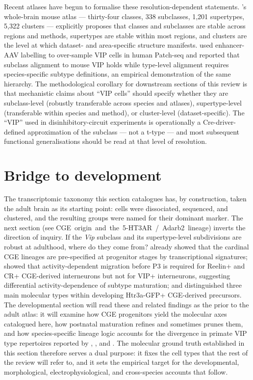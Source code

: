 \documentclass[11pt]{article}
\begin{document}
Recent atlases have begun to formalise these resolution-dependent statements. \citet{Yao2023}'s whole-brain mouse atlas --- thirty-four classes, 338 subclasses, 1,201 supertypes, 5,322 clusters --- explicitly proposes that classes and subclasses are stable across regions and methods, supertypes are stable within most regions, and clusters are the level at which dataset- and area-specific structure manifests. \citet{Lee2023a} used enhancer-AAV labelling to over-sample VIP cells in human Patch-seq and reported that subclass alignment to mouse VIP holds while type-level alignment requires species-specific subtype definitions, an empirical demonstration of the same hierarchy. The methodological corollary for downstream sections of this review is that mechanistic claims about ``VIP cells'' should specify whether they are subclass-level (robustly transferable across species and atlases), supertype-level (transferable within species and method), or cluster-level (dataset-specific). The ``VIP'' used in disinhibitory-circuit experiments is operationally a Cre-driver-defined approximation of the subclass --- not a t-type --- and most subsequent functional generalisations should be read at that level of resolution.

\section{Bridge to development}

The transcriptomic taxonomy this section catalogues has, by construction, taken the adult brain as its starting point: cells were dissociated, sequenced, and clustered, and the resulting groups were named for their dominant marker. The next section (see CGE~origin~and~the~5-HT3AR~/~Adarb2~lineage) inverts the direction of inquiry. If the \textit{Vip} subclass and its supertype-level subdivisions are robust at adulthood, where do they come from? \citet{Mayer2018} already showed that the cardinal CGE lineages are pre-specified at progenitor stages by transcriptional signatures; \citet{Demarcogarcia2011} showed that activity-dependent migration before P3 is required for Reelin+ and CR+ CGE-derived interneurons but not for VIP+ interneurons, suggesting differential activity-dependence of subtype maturation; and \citet{Frazer2017} distinguished three main molecular types within developing Htr3a-GFP+ CGE-derived precursors. The developmental section will read these and related findings as the prior to the adult atlas: it will examine how CGE progenitors yield the molecular axes catalogued here, how postnatal maturation refines and sometimes prunes them, and how species-specific lineage logic accounts for the divergence in primate VIP type repertoires reported by \citet{Bakken2021a}, \citet{Hodge2019}, and \citet{Wei2022}. The molecular ground truth established in this section therefore serves a dual purpose: it fixes the cell types that the rest of the review will refer to, and it sets the empirical target for the developmental, morphological, electrophysiological, and cross-species accounts that follow.
\end{document}
